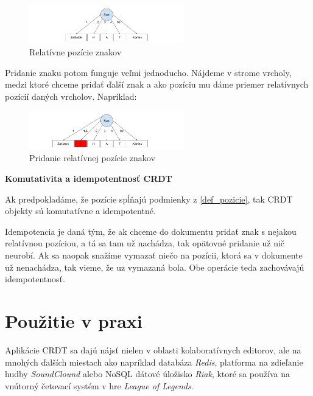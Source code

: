 \begin{figure}[H]
\centerline{\includegraphics[width=0.6\textwidth]{images/relativne_pozicie1}}
\caption[Relatívne pozície znakov]{Relatívne pozície znakov}
\label{obr:relativne}
\end{figure}

Pridanie znaku potom funguje veľmi jednoducho. Nájdeme v strome vrcholy, medzi ktoré
chceme pridať ďalší znak a ako pozíciu mu dáme priemer relatívnych pozícií daných
vrcholov. Napríklad:
\begin{figure}[H]
\centerline{\includegraphics[width=0.6\textwidth]{images/relativne_pozicie2}}
\caption[Pridanie relatívnej pozície znakov]{Pridanie relatívnej pozície znakov}
\label{obr:relativne_pridanie}
\end{figure}

\begin{flushleft}\textbf {Komutativita a idempotentnosť CRDT}\end{flushleft}
Ak predpokladáme, že pozície spĺňajú podmienky z \ref{def_pozicie}, tak CRDT objekty sú
komutatívne a idempotentné.

Idempotencia je daná tým, že ak chceme do dokumentu pridať znak s nejakou relatívnou pozíciou, a tá
sa tam už nachádza, tak opätovné pridanie už nič neurobí. Ak sa naopak snažíme vymazať niečo na
pozícii, ktorá sa v dokumente už nenachádza, tak vieme, že uz vymazaná bola. Obe operácie teda
zachovávajú idempotentnosť.
\cite{nuno_preguica}

\section{Použitie v praxi}
Aplikácie CRDT sa dajú nájsť nielen v oblasti kolaboratívnych editorov, ale na mnohých ďalších
miestach ako napríklad databáza \textit{Redis}, platforma na zdieľanie hudby \textit{SoundClound}
alebo NoSQL 
dátové úložisko \textit{Riak}, ktoré sa používa na vnútorný četovací systém v hre 
\textit{League of Legends}.

